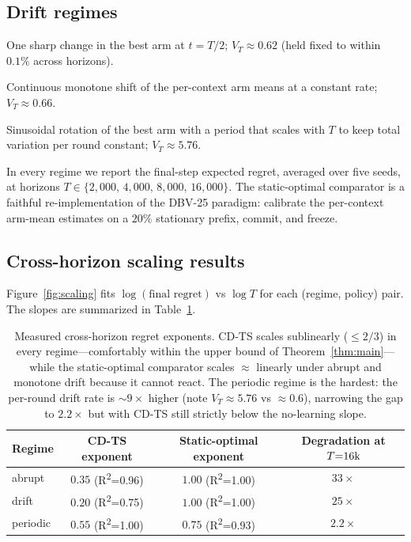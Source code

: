 \documentclass[11pt]{article}
\theoremstyle{definition}
\begin{document}
\subsection{Drift regimes}

\begin{description}[leftmargin=0pt, style=nextline, itemsep=2pt]
\item[Abrupt.] One sharp change in the best arm at $t = T/2$;
$V_T \approx 0.62$ (held fixed to within $0.1\%$ across horizons).
\item[Drift.] Continuous monotone shift of the per-context arm means at a
constant rate; $V_T \approx 0.66$.
\item[Periodic.] Sinusoidal rotation of the best arm with a period that
scales with $T$ to keep total variation per round constant;
$V_T \approx 5.76$.
\end{description}

In every regime we report the final-step expected regret, averaged over
five seeds, at horizons $T \in \{2{,}000,\, 4{,}000,\, 8{,}000,\, 16{,}000\}$.
The static-optimal comparator is a faithful re-implementation of the DBV-25
paradigm: calibrate the per-context arm-mean estimates on a $20\%$
stationary prefix, commit, and freeze.

\subsection{Cross-horizon scaling results}

Figure~\ref{fig:scaling} fits $\log(\text{final regret})$ vs $\log T$ for
each (regime, policy) pair. The slopes are summarized in
Table~\ref{tab:scaling}.

\begin{table}[h]
\centering
\begin{tabular}{lccc}
\toprule
Regime & CD-TS exponent & Static-optimal exponent & Degradation at $T{=}16{\rm k}$ \\
\midrule
abrupt   & $0.35$ \;(R\textsuperscript{2}{=}0.96) & $1.00$ \;(R\textsuperscript{2}{=}1.00) & $33\times$ \\
drift    & $0.20$ \;(R\textsuperscript{2}{=}0.75) & $1.00$ \;(R\textsuperscript{2}{=}1.00) & $25\times$ \\
periodic & $0.55$ \;(R\textsuperscript{2}{=}1.00) & $0.75$ \;(R\textsuperscript{2}{=}0.93) & $2.2\times$ \\
\bottomrule
\end{tabular}
\caption{Measured cross-horizon regret exponents. CD-TS scales sublinearly
($\leq 2/3$) in every regime---comfortably within the upper bound of
Theorem~\ref{thm:main}---while the static-optimal comparator scales
$\approx$ linearly under abrupt and monotone drift because it cannot
react. The periodic regime is the hardest: the per-round drift rate is
$\sim 9\times$ higher (note $V_T \approx 5.76$ vs $\approx 0.6$), narrowing
the gap to $2.2\times$ but with CD-TS still strictly below the no-learning
slope.}
\label{tab:scaling}
\end{table}
\end{document}
